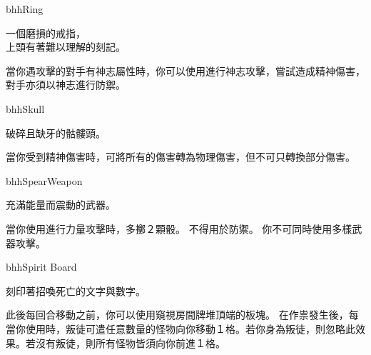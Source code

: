 \linebreak[0]%
\begin{OmenCard}{bhh}{Ring}{}
	\begin{CardStory}
		一個磨損的戒指，\\
		上頭有著難以理解的刻記。
	\end{CardStory}
	當你遇攻擊的對手有神志屬性時，你可以使用\ThisName{}進行神志攻擊，嘗試造成精神傷害，對手亦須以神志進行防禦。\smallbreak
\end{OmenCard}%
\linebreak[0]%
\begin{OmenCard}{bhh}{Skull}{}
	\begin{CardStory}
		破碎且缺牙的骷髏頭。
	\end{CardStory}
	當你受到精神傷害時，可將所有的傷害轉為物理傷害，但不可只轉換部分傷害。\smallbreak
\end{OmenCard}%
\linebreak[0]%
\begin{OmenCard}{bhh}{Spear}{Weapon}
	\begin{CardStory}
		充滿能量而震動的武器。
	\end{CardStory}
	當你使用\ThisName{}進行力量攻擊時，多擲２顆骰。\smallbreak
	\ThisName{}不得用於防禦。\smallbreak
	你不可同時使用多樣武器攻擊。\smallbreak
\end{OmenCard}%
\linebreak[0]%
\begin{OmenCard}{bhh}{Spirit Board}{}
	\begin{CardStory}
		刻印著招喚死亡的文字與數字。
	\end{CardStory}
	此後每回合移動之前，你可以使用\ThisName{}窺視房間牌堆頂端的板塊。\smallbreak
	在作祟發生後，每當你使用\ThisName{}時，叛徒可遣任意數量的怪物向你移動１格。若你身為叛徒，則忽略此效果。若沒有叛徒，則所有怪物皆須向你前進１格。\smallbreak
\end{OmenCard}%
\linebreak[0]%
